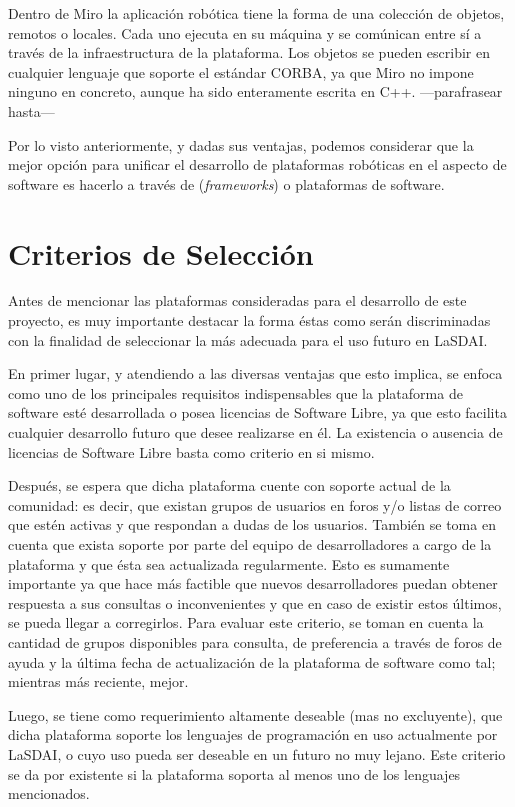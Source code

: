 \begin{itemize}
	Dentro de Miro la aplicación robótica tiene la forma de una colección de objetos, remotos o locales. Cada uno ejecuta en su máquina y se comúnican entre sí a través de la infraestructura de la plataforma. Los objetos se pueden escribir en cualquier lenguaje que soporte el estándar CORBA, ya que Miro no impone ninguno en concreto, aunque ha sido enteramente escrita en C++.
---parafrasear hasta---
\end{itemize}

Por lo visto anteriormente, y dadas sus ventajas, podemos considerar que la mejor opción para unificar el desarrollo de plataformas robóticas en el aspecto de software es hacerlo a través de (\textit{frameworks}) o plataformas de software.

\section{Criterios de Selección}

Antes de mencionar las plataformas consideradas para el desarrollo de este proyecto, es muy importante destacar la forma éstas como serán discriminadas con la finalidad de seleccionar la más adecuada para el uso futuro en LaSDAI.

En primer lugar, y atendiendo a las diversas ventajas que esto implica, se enfoca como uno de los principales requisitos indispensables que la plataforma de software esté desarrollada o posea licencias de Software Libre, ya que esto facilita cualquier desarrollo futuro que desee realizarse en él. La existencia o ausencia de licencias de Software Libre basta como criterio en si mismo.

Después, se espera que dicha plataforma cuente con soporte actual de la comunidad: es decir, que existan grupos de usuarios en foros y/o listas de correo que estén activas y que respondan a dudas de los usuarios. También se toma en cuenta que exista soporte por parte del equipo de desarrolladores a cargo de la plataforma y que ésta sea actualizada regularmente. Esto es sumamente importante ya que hace más factible que nuevos desarrolladores puedan obtener respuesta a sus consultas o inconvenientes y que en caso de existir estos últimos, se pueda llegar a corregirlos. Para evaluar este criterio, se toman en cuenta la cantidad de grupos disponibles para consulta, de preferencia a través de foros de ayuda y la última fecha de actualización de la plataforma de software como tal; mientras más reciente, mejor.

Luego, se tiene como requerimiento altamente deseable (mas no excluyente), que dicha plataforma soporte los lenguajes de programación en uso actualmente por LaSDAI, o cuyo uso pueda ser deseable en un futuro no muy lejano. Este criterio se da por existente si la plataforma soporta al menos uno de los lenguajes mencionados.

